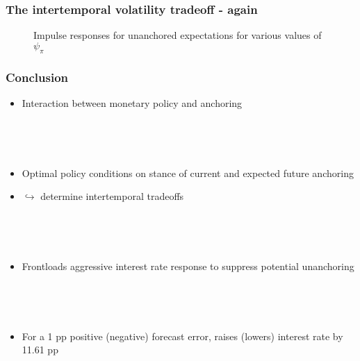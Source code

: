 \documentclass[10pt]{beamer}
\def \myFigPath {../../../figures/}
\def\ppFEunanchors{1 }
\def\ppMoveFFR{11.61 }
\def\fignameIRFpsipiSmall{command_IFS_anchoring_pretty_RIR_LH_unanch_monpol_again_critCUSUM_constant_only_T_400_N_1000_burnin_5_params_psi_pi_1_01_psi_x_0_gbar_0_145_thetbar_16_thettilde_2_5_kap_0_8_lamx_0_lami_0_date_2020_06_05}
\def\fignameIRFpsipiMedium{command_IFS_anchoring_pretty_RIR_LH_unanch_monpol_again_critCUSUM_constant_only_T_400_N_1000_burnin_5_params_psi_pi_1_5_psi_x_0_gbar_0_145_thetbar_16_thettilde_2_5_kap_0_8_lamx_0_lami_0_date_2020_06_05}
\def\fignameIRFpsipiBig{command_IFS_anchoring_pretty_RIR_LH_unanch_monpol_again_critCUSUM_constant_only_T_400_N_1000_burnin_5_params_psi_pi_2_psi_x_0_gbar_0_145_thetbar_16_thettilde_2_5_kap_0_8_lamx_0_lami_0_date_2020_06_05}
\begin{document}
\begin{frame}
	\frametitle{The intertemporal volatility tradeoff - again}

\begin{figure}[h!]
\caption{Impulse responses for unanchored expectations for various values of $\psi_{\pi}$}
\label{IRF_unanchored_psi}
\end{figure}

\end{frame}

\begin{frame}
	\frametitle{Conclusion}
	
\begin{itemize}
\item Interaction between monetary policy and anchoring 

\

\

\item Optimal policy conditions on stance of current and expected future anchoring
\item[] \hspace{4cm} $\hookrightarrow$ determine intertemporal tradeoffs

\

\

\item Frontloads aggressive interest rate response to suppress potential unanchoring

\

\

\item For a \ppFEunanchors pp positive (negative) forecast error, raises (lowers) interest rate by \ppMoveFFR pp
\end{itemize}


\end{frame}



%
\end{document}
